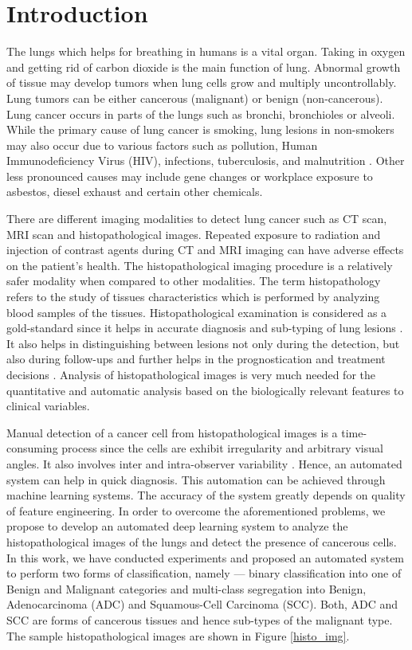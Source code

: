\documentclass{comjnl}
\begin{document}
\section{Introduction}

 The lungs which helps for breathing in humans is a vital organ. Taking in oxygen and getting rid of carbon dioxide is the main function of lung. Abnormal growth of tissue may develop tumors when lung cells grow and multiply uncontrollably.  Lung tumors can be either cancerous (malignant) or benign (non-cancerous). Lung cancer occurs in parts of the lungs such as bronchi, bronchioles or alveoli. While the primary cause of lung cancer is smoking, lung lesions in non-smokers may also occur due to various factors such as pollution, Human Immunodeficiency Virus (HIV), infections, tuberculosis, and malnutrition \cite{lad}. Other less pronounced causes may include gene changes or workplace exposure to asbestos, diesel exhaust and certain other chemicals. 
 
 There are different imaging modalities to detect lung cancer such as CT scan, MRI scan and histopathological images. Repeated exposure to radiation and injection of contrast agents during CT and MRI imaging can have adverse effects on the patient's health. The histopathological imaging procedure is a relatively safer modality when compared to other modalities. The term histopathology refers to the study of tissues characteristics which is performed by analyzing blood samples of the tissues. Histopathological examination is considered as a gold-standard since it helps in accurate diagnosis and sub-typing of lung lesions \cite{histo_study_lungbiopsy}. It also helps in distinguishing between lesions not only during the detection, but also during follow-ups and further helps in the prognostication and treatment decisions \cite{histopath_role}. Analysis of histopathological images is very much needed for the quantitative and automatic analysis  based  on the biologically relevant features to clinical variables.
 
 Manual detection of a cancer cell from histopathological images is a time-consuming process since the cells are exhibit irregularity and arbitrary visual angles. It also involves inter and intra-observer variability \cite{sumaiya}. Hence, an automated system can help in quick diagnosis. This automation can be achieved through machine learning systems. The accuracy of the system greatly depends on quality of feature engineering. In order to overcome the aforementioned problems, we propose to develop an automated deep learning system to analyze the histopathological images of the lungs and detect the presence of cancerous cells. In this work, we have conducted experiments and proposed an automated system to perform two forms of classification, namely --- binary classification into one of Benign and Malignant categories and multi-class segregation into Benign, Adenocarcinoma (ADC) and Squamous-Cell Carcinoma (SCC). Both, ADC and SCC are forms of cancerous tissues and hence sub-types of the malignant type. The sample histopathological images are shown in Figure \ref{histo_img}.
 
\end{document}
